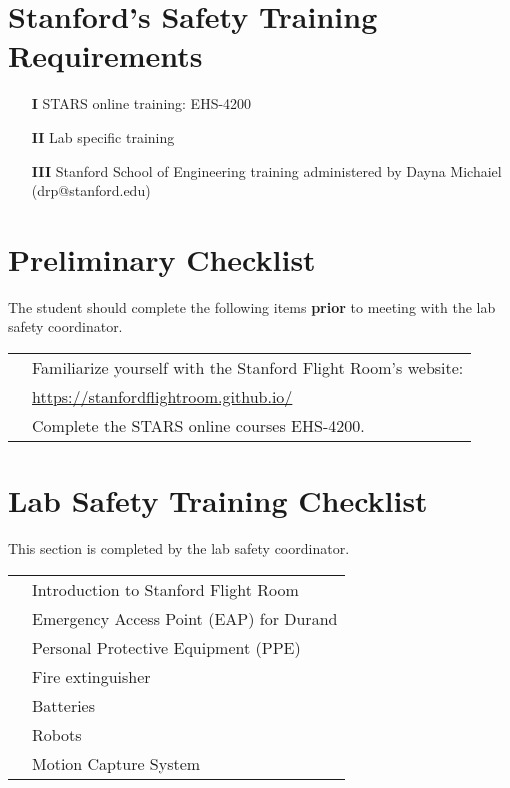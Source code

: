 \documentclass[letterpaper,11pt]{article}
\newcommand{\linespace}{\vspace{4mm}}		%
\newcommand{\red}[1]{\textcolor{stanford_red}{#1}}
\begin{document}
\section{\red{Stanford's Safety Training Requirements}}
\begin{enumerate}
	\item[\textbf{I}] STARS online training: EHS-4200
	\item[\textbf{II}] Lab specific training
	\item[\textbf{III}] Stanford School of Engineering training administered by Dayna Michaiel (drp@stanford.edu)
\end{enumerate}

\section{\red{Preliminary Checklist}}
\noindent
The student should complete the following items \textbf{prior} to meeting with the lab safety coordinator. 

\linespace\noindent
\begin{tabular}{ll}
	\CheckBox[name=preliminary1, width=1em] &Familiarize yourself with the Stanford Flight Room's website: \\
		& \url{https://stanfordflightroom.github.io/} \\
	\CheckBox[name=preliminary2, width=1em] & Complete the STARS online courses EHS-4200. \\
\end{tabular}

\section{\red{Lab Safety Training Checklist}}
\noindent
This section is completed by the lab safety coordinator. 

\linespace\noindent
\begin{tabular}{ll}
	\CheckBox[name=check1, width=1em] &Introduction to Stanford Flight Room\\
	\CheckBox[name=check2, width=1em] &Emergency Access Point (EAP) for Durand\\
	\CheckBox[name=check3, width=1em] &Personal Protective Equipment (PPE)\\
	\CheckBox[name=check4, width=1em] &Fire extinguisher\\
	\CheckBox[name=check5, width=1em] &Batteries\\
	\CheckBox[name=check6, width=1em] &Robots\\
	\CheckBox[name=check7, width=1em] &Motion Capture System\\
\end{tabular}

\addtolength{\textheight}{-12cm}   %
\end{document}
